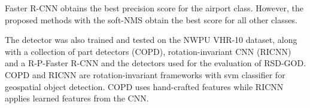 Faster R-CNN obtains the best precision score for the airport class. However, the proposed methods with the soft-NMS obtain the best score for all other classes. 

The detector was also trained and tested on the NWPU VHR-10\cite{nwpu} dataset, along with a collection of part detectors (COPD)\cite{copd}, rotation-invariant CNN (RICNN)\cite{ricnn} and a R-P-Faster R-CNN\cite{rpfrcnn} and the detectors used for the evaluation of RSD-GOD. COPD and RICNN are rotation-invariant frameworks with \gls{svm} classifier for geospatial object detection. COPD uses hand-crafted features while RICNN applies learned features from the CNN.



